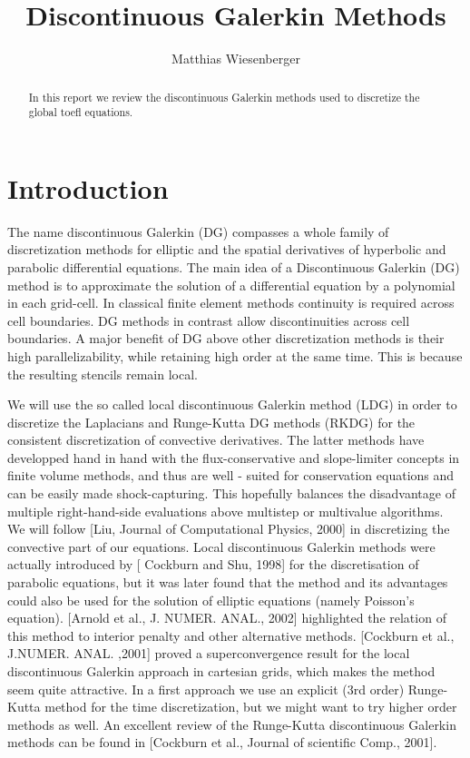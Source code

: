 \documentclass[a4paper,12pt]{scrartcl}
\title{Discontinuous Galerkin Methods}
\author{Matthias  Wiesenberger}
\begin{document}
\maketitle

\begin{abstract}
    In this report we review the discontinuous Galerkin methods used to discretize the global toefl equations. 
\end{abstract}

\section{Introduction}
The name discontinuous Galerkin (DG) compasses a whole family of discretization
methods for elliptic and the spatial derivatives of hyperbolic and parabolic
differential equations. 
The main idea of a Discontinuous Galerkin (DG) method is to approximate the solution 
of a differential equation by a polynomial in each grid-cell. 
In classical finite element methods continuity is required across cell boundaries. 
DG methods in contrast allow discontinuities across cell boundaries. 
A major benefit of DG above other discretization methods is their high parallelizability,
while retaining high order at the same time. This is because the resulting 
 stencils remain local.

We will use the so called local discontinuous Galerkin method (LDG) in order 
to discretize the Laplacians and Runge-Kutta DG methods (RKDG) for 
the consistent discretization of convective derivatives. The latter methods
have developped hand in hand with the flux-conservative and slope-limiter 
concepts in finite volume methods, and thus are well - suited for 
conservation equations and can be easily made shock-capturing. 
This hopefully balances the disadvantage of multiple right-hand-side
evaluations above multistep or multivalue algorithms.
We will follow [Liu, Journal of Computational Physics, 2000] 
in discretizing the convective part of our equations.
Local discontinuous Galerkin methods were actually introduced by [ Cockburn and Shu, 1998] for the discretisation of parabolic equations, but
it was later found that the method and its advantages could also be used for the solution of elliptic 
equations (namely Poisson's equation). 
[Arnold et al., J. NUMER. ANAL., 2002] highlighted the relation 
of this method to interior penalty and other alternative methods. 
[Cockburn et al., J.NUMER. ANAL. ,2001] proved a superconvergence result for the 
local discontinuous Galerkin approach in cartesian grids, which makes the method seem 
quite attractive. 
In a first approach we use an explicit (3rd order) Runge-Kutta method for 
the time discretization, but we might want to try higher order methods as well.   
An excellent review of the Runge-Kutta discontinuous Galerkin methods can be found in [Cockburn et al., Journal of scientific Comp., 2001]. 
\end{document}
